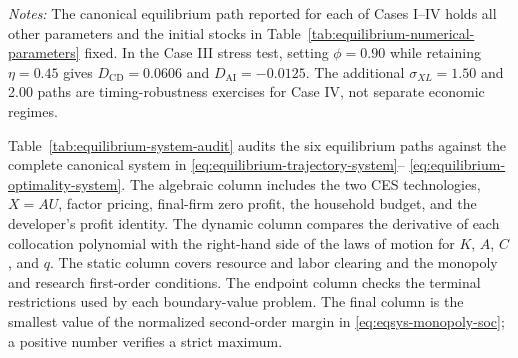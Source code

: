 \begin{table}[H]
    \centering
    \caption{Targeted parameter configurations}
    \label{tab:targeted-configurations}
    \begin{minipage}{0.96\textwidth}
    \footnotesize\emph{Notes:} The canonical equilibrium path reported for each of
    Cases I--IV holds all other parameters and the initial stocks in
    Table~\ref{tab:equilibrium-numerical-parameters} fixed. In the Case III stress
    test, setting $\phi=0.90$ while retaining $\eta=0.45$ gives
    $D_{\mathrm{CD}}=0.0606$ and $D_{\mathrm{AI}}=-0.0125$. The additional
    $\sigma_{XL}=1.50$ and 2.00 paths are timing-robustness exercises for
    Case IV, not separate economic regimes.
    \end{minipage}
\end{table}

Table~\ref{tab:equilibrium-system-audit} audits the six equilibrium paths against the complete
canonical system in \eqref{eq:equilibrium-trajectory-system}--
\eqref{eq:equilibrium-optimality-system}. The algebraic column includes
the two CES technologies, $X=AU$, factor pricing, final-firm zero profit, the
household budget, and the developer's profit identity. The dynamic column compares
the derivative of each collocation polynomial with the right-hand side of the laws
of motion for $K$, $A$, $C$, and $q$. The static column covers resource and labor
clearing and the monopoly and research first-order conditions. The endpoint column
checks the terminal restrictions used by each boundary-value problem. The final column is
the smallest value of the normalized second-order margin in
\eqref{eq:eqsys-monopoly-soc}; a positive number verifies a strict maximum.

